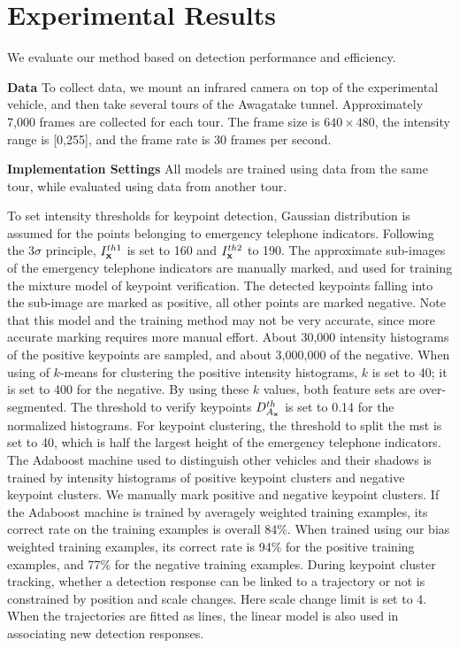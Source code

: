 \documentclass{JoITSRstyle}
\begin{document}
\section{Experimental Results}
We evaluate our method based on detection performance and efficiency.

\textbf{Data} To collect data, we mount an infrared camera on top of the experimental vehicle, and then  take several tours of the Awagatake tunnel. Approximately 7,000 frames are collected for each tour. The frame size is $640\times 480$, the intensity range is [0,255], and the frame rate is 30 frames per second.

\textbf{Implementation Settings} All models are trained using data from the same tour, while evaluated using data from another tour.

To set intensity thresholds for keypoint detection, Gaussian distribution is assumed for the points belonging to emergency telephone indicators. Following the $3\sigma$ principle, $I^{th1}_{\bf{x}}$ is set to 160 and $I^{th2}_{\bf{x}}$ to 190.
The approximate sub-images of the emergency telephone indicators are manually marked, and used for training the mixture model of keypoint verification. The detected keypoints falling into the sub-image are marked as positive, all other points are marked negative. Note that this model and the training method may not be very accurate, since more accurate marking requires more manual effort. About 30,000 intensity histograms of the positive keypoints are sampled, and about 3,000,000 of the negative. When using of $k$-means for clustering the positive intensity histograms, $k$ is set to 40; it is set to 400 for the negative. By using these $k$ values,  both feature sets are over-segmented. The threshold to verify keypoints $D^{th}_{A_{\bf{x}}}$ is set to 0.14 for the normalized histograms.
For keypoint clustering, the threshold to split the mst is set to 40, which is half the largest height of the emergency telephone indicators.
The Adaboost machine used to distinguish other vehicles and their shadows is trained by intensity histograms of positive keypoint clusters and negative keypoint clusters. We manually mark  positive  and  negative keypoint clusters. If the Adaboost machine is trained by averagely weighted training examples, its correct rate on the training examples is overall 84\%. When trained using our bias weighted training examples, its correct rate is  94\% for the positive training examples, and 77\% for the negative training examples.
During keypoint cluster tracking, whether a detection response can be linked to a trajectory or not is constrained by position and scale changes. Here scale change limit is set to 4. When the trajectories are fitted as lines, the linear model is also used in associating new detection responses.
\end{document}
